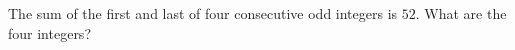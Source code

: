 The sum of the first and last of four consecutive odd integers is $52$. What are the four integers?
